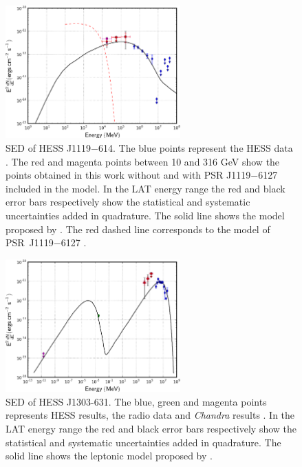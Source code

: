 \begin{figure}[h!]
\centering
\includegraphics[width=0.60\textwidth]{figures/HESSJ1119.eps}
\caption{SED of HESS J1119$-$614. The blue points represent the HESS data \citep{Mayerdiploma}. The red and magenta points between 10 and 316 GeV show the points obtained in this work without and with PSR J1119$-$6127 included in the model. In the LAT energy range the red and black error bars respectively show the statistical and systematic uncertainties added in quadrature. The solid line shows the model proposed by \cite{Mayerdiploma}. The red dashed line corresponds to the model of PSR~J1119$-$6127 \citep{2012ApJS..199...31N}.
\label{fig:hessj1119}}
\end{figure}



\begin{figure}[h!]
\centering
\includegraphics[width=0.60\textwidth]{figures/HESSJ1303631.eps}
\caption{SED of HESS J1303-631. The blue, green and magenta points represents HESS results, the radio data and \emph{Chandra} results \citep{dalton1303}. In the LAT energy range the red and black error bars respectively show the statistical and systematic uncertainties added in quadrature. The solid line shows the leptonic model proposed by \cite{dalton1303}.
\label{fig:hessj1303}}
\end{figure}


